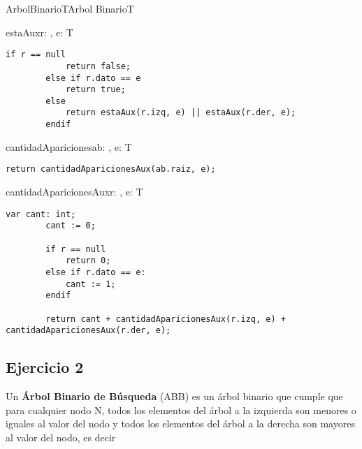 \begin{module}{ArbolBinario}{T}{Arbol Binario}{T}
	\begin{proc}{estaAux}{\In r: \nodo, \In e: T}{\bool}
		\begin{lstlisting}[numbers=none,frame=none]
		if r == null
			return false;
		else if r.dato == e
			return true;
		else
			return estaAux(r.izq, e) || estaAux(r.der, e);
		endif
		\end{lstlisting}
	\end{proc}

	\begin{proc}{cantidadApariciones}{\In ab: \moduletype, \In e: T}{\Int}
		\begin{lstlisting}[numbers=none,frame=none]
		return cantidadAparicionesAux(ab.raiz, e);
		\end{lstlisting}
	\end{proc}

	\begin{proc}{cantidadAparicionesAux}{\In r: \nodo, \In e: T}{\Int}
		\begin{lstlisting}[numbers=none,frame=none]
		var cant: int;
		cant := 0;

		if r == null
			return 0;
		else if r.dato == e:
			cant := 1;
		endif
		
		return cant + cantidadAparicionesAux(r.izq, e) + cantidadAparicionesAux(r.der, e);
		\end{lstlisting}
	\end{proc}

\end{module}

\subsection{Ejercicio 2}
Un \textbf{Árbol Binario de Búsqueda} (ABB) es un árbol binario que cumple que para cualquier nodo N, todos los elementos del árbol a la izquierda son menores o iguales al valor del nodo y todos los elementos del árbol a la derecha son mayores al valor del nodo, es decir



